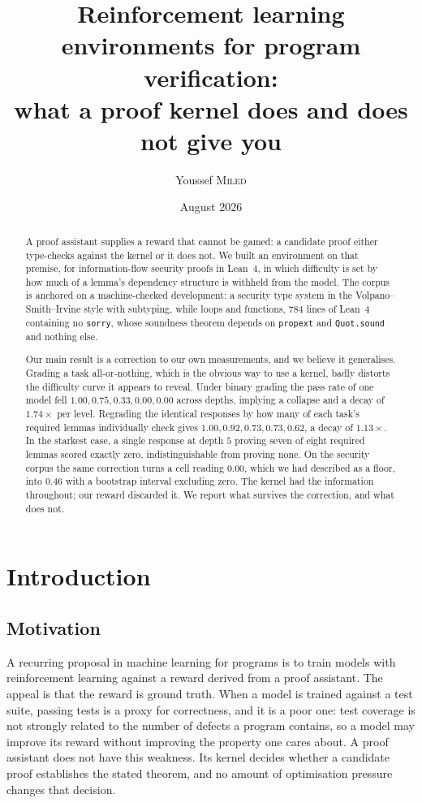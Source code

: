 \documentclass[11pt]{article}
\title{Reinforcement learning environments for program verification:\\
what a proof kernel does and does not give you}
\author{Youssef \textsc{Miled}}
\date{August 2026}
\begin{document}
\maketitle

\begin{abstract}
\noindent
A proof assistant supplies a reward that cannot be gamed: a candidate proof
either type-checks against the kernel or it does not. We built an environment on
that premise, for information-flow security proofs in Lean~4, in which difficulty
is set by how much of a lemma's dependency structure is withheld from the model.
The corpus is anchored on a machine-checked development: a security type system
in the Volpano--Smith--Irvine style with subtyping, while loops and functions,
$784$ lines of Lean~4 containing no \verb|sorry|, whose soundness theorem depends
on \verb|propext| and \verb|Quot.sound| and nothing else.

Our main result is a correction to our own measurements, and we believe it
generalises. Grading a task all-or-nothing, which is the obvious way to use a
kernel, badly distorts the difficulty curve it appears to reveal. Under binary
grading the pass rate of one model fell $1.00, 0.75, 0.33, 0.00, 0.00$ across
depths, implying a collapse and a decay of $1.74\times$ per level. Regrading the
identical responses by how many of each task's required lemmas individually
check gives $1.00, 0.92, 0.73, 0.73, 0.62$, a decay of $1.13\times$. In the starkest
case, a single response at depth $5$ proving seven of eight required lemmas
scored exactly zero, indistinguishable from proving none. On the security corpus
the same correction turns a cell reading $0.00$, which we had described as a
floor, into $0.46$ with a bootstrap interval excluding zero. The kernel had the
information throughout; our reward discarded it. We report what survives the
correction, and what does not.
\end{abstract}

\tableofcontents

\section{Introduction}

\subsection{Motivation}

A recurring proposal in machine learning for programs is to train models with
reinforcement learning against a reward derived from a proof assistant. The
appeal is that the reward is ground truth. When a model is trained against a
test suite, passing tests is a proxy for correctness, and it is a poor one: test
coverage is not strongly related to the number of defects a program contains, so
a model may improve its reward without improving the property one cares about.
A proof assistant does not have this weakness. Its kernel decides whether a
candidate proof establishes the stated theorem, and no amount of optimisation
pressure changes that decision.
\end{document}
